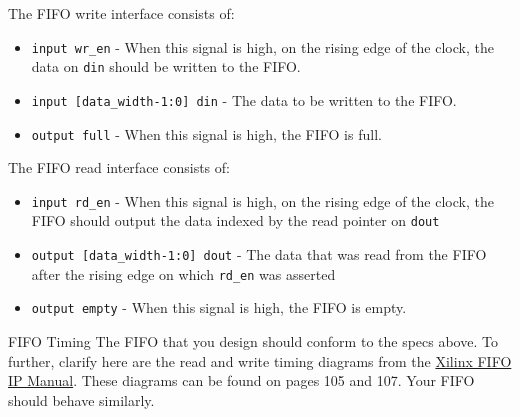 \documentclass[11pt]{article}
\makeatletter
\renewcommand{\subsection}
{\@startsection {subsection}{1}{0pt}
 {-1ex}
 {0.5ex}
 {\bfseries\normalsize}}
\makeatother
\begin{document}
The FIFO write interface consists of:
\begin{itemize}
    \item \verb|input wr_en| - When this signal is high, on the rising edge of the clock, the data on \verb|din| should be written to the FIFO.
    \item \verb|input [data_width-1:0] din| - The data to be written to the FIFO.
    \item \verb|output full| - When this signal is high, the FIFO is full.
\end{itemize}

The FIFO read interface consists of:
\begin{itemize}
    \item \verb|input rd_en| - When this signal is high, on the rising edge of the clock, the FIFO should output the data indexed by the read pointer on \verb|dout|
    \item \verb|output [data_width-1:0] dout| - The data that was read from the FIFO after the rising edge on which \verb|rd_en| was asserted
    \item \verb|output empty| - When this signal is high, the FIFO is empty.
\end{itemize}

\subsection{FIFO Timing}
The FIFO that you design should conform to the specs above.
To further, clarify here are the read and write timing diagrams from the \href{https://www.xilinx.com/support/documentation/ip_documentation/fifo_generator_ug175.pdf}{Xilinx FIFO IP Manual}.
These diagrams can be found on pages 105 and 107.
Your FIFO should behave similarly.
\end{document}
